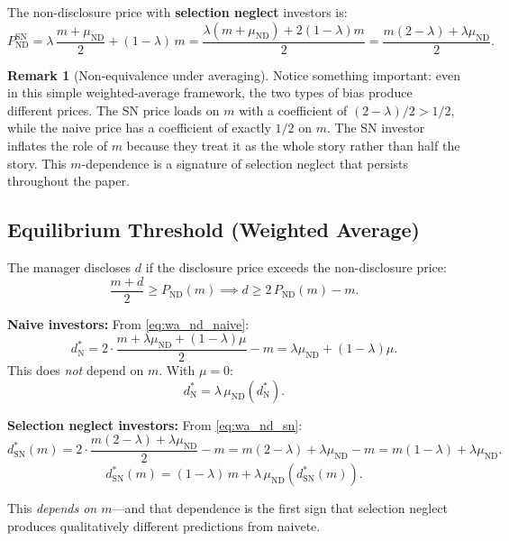 \documentclass[12pt]{article}
\theoremstyle{plain}
\theoremstyle{definition}
\newtheorem{remark}{Remark}
\newcommand{\ND}{\mathrm{ND}}
\newcommand{\SN}{\mathrm{SN}}
\newcommand{\N}{\mathrm{N}}
\begin{document}
The non-disclosure price with \textbf{selection neglect} investors is:
\begin{equation}
P_{\ND}^\SN = \lambda\,\frac{m + \mu_{\ND}}{2} + (1-\lambda)\, m = \frac{\lambda(m + \mu_{\ND}) + 2(1-\lambda)m}{2} = \frac{m(2-\lambda) + \lambda\mu_{\ND}}{2}.
\label{eq:wa_nd_sn}
\end{equation}

\begin{remark}[Non-equivalence under averaging]
\label{rmk:nonequiv}
Notice something important: even in this simple weighted-average framework, the two types of bias produce different prices. The SN price loads on $m$ with a coefficient of $(2-\lambda)/2 > 1/2$, while the naive price has a coefficient of exactly $1/2$ on $m$. The SN investor inflates the role of $m$ because they treat it as the whole story rather than half the story. This $m$-dependence is a signature of selection neglect that persists throughout the paper.
\end{remark}

\subsection{Equilibrium Threshold (Weighted Average)}

The manager discloses $d$ if the disclosure price exceeds the non-disclosure price:
\[
\frac{m + d}{2} \geq P_{\ND}(m) \implies d \geq 2\,P_{\ND}(m) - m.
\]

\textbf{Naive investors:} From \eqref{eq:wa_nd_naive}:
\[
d^*_\N = 2 \cdot \frac{m + \lambda\mu_{\ND} + (1-\lambda)\mu}{2} - m = \lambda\mu_{\ND} + (1-\lambda)\mu.
\]
This does \emph{not} depend on $m$. With $\mu = 0$:
\begin{equation}
d^*_\N = \lambda\,\mu_{\ND}(d^*_\N).
\label{eq:wa_threshold_naive}
\end{equation}

\textbf{Selection neglect investors:} From \eqref{eq:wa_nd_sn}:
\[
d^*_\SN(m) = 2 \cdot \frac{m(2-\lambda) + \lambda\mu_{\ND}}{2} - m = m(2 - \lambda) + \lambda\mu_{\ND} - m = m(1-\lambda) + \lambda\mu_{\ND}.
\]
\begin{equation}
\boxed{d^*_\SN(m) = (1-\lambda)\,m + \lambda\,\mu_{\ND}(d^*_\SN(m)).}
\label{eq:wa_threshold_sn}
\end{equation}

This \emph{depends on $m$}---and that dependence is the first sign that selection neglect produces qualitatively different predictions from naivete.
\end{document}
